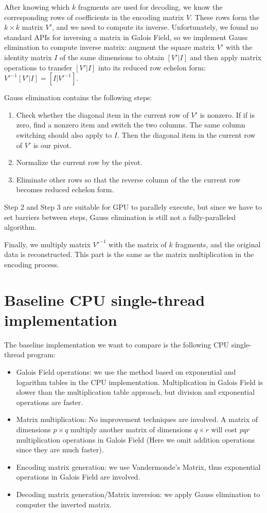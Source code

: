 \documentclass[a4paper]{article}
\begin{document}

After knowing which $k$ fragments are used for decoding, we know the corresponding rows of coefficients in the encoding matrix $V$.
These rows form the $k \times k$ matrix $V'$, and we need to compute its inverse.
Unfortunately, we found no standard APIs for inversing a matrix in Galois Field, 
so we implement Gauss elimination to compute inverse matrix: 
augment the square matrix $V'$ with the identity matrix $I$ of the same dimensions to obtain $[V' | I]$ and then apply matrix operations to transfer $[V' | I]$ into its reduced row echelon form: $V'^{-1}[V' | I] = [I | V'^{-1}]$.

Gauss elimination contains the following steps:
\begin{enumerate}
\item Check whether the diagonal item in the current row of $V'$ is nonzero. If if is zero, find a nonzero item and switch the two columns. The same column switching should also apply to $I$. Then the diagonal item in the current row of $V'$ is our pivot.
\item Normalize the current row by the pivot.
\item Eliminate other rows so that the reverse column of the the current row becomes reduced echelon form.
\end{enumerate}
Step 2 and Step 3 are suitable for GPU to parallely execute, but since we have to set barriers between steps, Gauss elimination is still not a fully-paralleled algorithm.

Finally, we multiply matrix $V'^{-1}$ with the matrix of $k$ fragments,
and the original data is reconstructed. This part is the same as the matrix multiplication in the encoding process.


\section{Baseline CPU single-thread implementation}
The baseline implementation we want to compare is the following CPU single-thread program:
\begin{itemize}
\item Galois Field operations: we use the method based on exponential and logarithm tables in the CPU implementation.
Multiplication in Galois Field is slower than the multiplication table approach, 
but division and exponential operations are faster.
\item Matrix multiplication: No improvement techniques are involved. A matrix of dimensions $p \times q$ multiply another matrix of dimensions $q \times r$ will cost $pqr$ multiplication operations in Galois Field (Here we omit addition operations since they are much faster).
\item Encoding matrix generation: we use Vandermonde’s Matrix, thus exponential operations in Galois Field are involved.
\item Decoding matrix generation/Matrix inversion: we apply Gauss elimination to computer the inverted matrix.				
\end{itemize}
\end{document}
